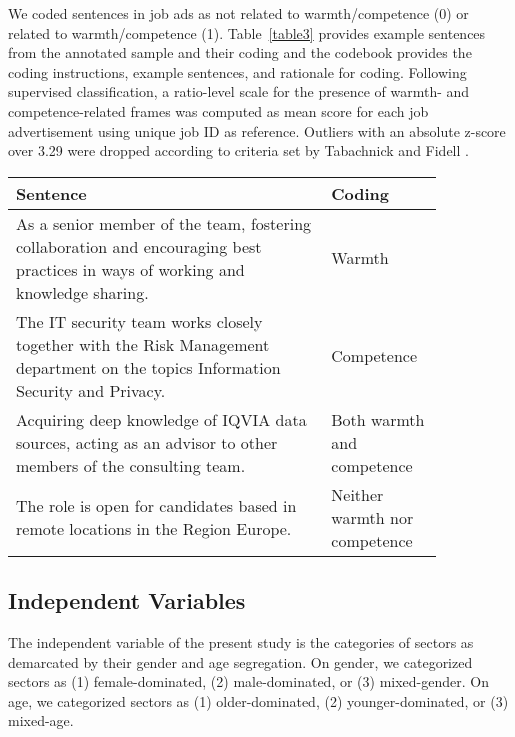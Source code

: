 \documentclass[jou]{apa7}
\begin{document}
We coded sentences in job ads as not related to warmth/competence (0) or related to warmth/competence (1). Table~\ref{table3} provides example sentences from the annotated sample and their coding and the codebook provides the coding instructions, example sentences, and rationale for coding. Following supervised classification, a ratio-level scale for the presence of warmth- and competence-related frames was computed as mean score for each job advertisement using unique job ID as reference. Outliers with an absolute z-score over 3.29 were dropped according to criteria set by Tabachnick and Fidell \parencite{tabachnickUsingMultivariateStatistics2007}.

\begin{table*}
    \centering
    \vspace*{2em}
    \begin{threeparttable}
        \caption{Example sentence and their coding based on emphasis on warmth and competence}
        \label{table3}
        \begin{tabular}[]{@{}m{0.65\linewidth} m{0.20\linewidth}@{}}
            \toprule
            Sentence & Coding\\
            \midrule
            As a senior member of the team, fostering collaboration and encouraging best practices in ways of working and knowledge sharing. & Warmth\\
            \midrule
            The IT security team works closely together with the Risk Management department on the topics Information Security and Privacy. & Competence\\
            \midrule
            Acquiring deep knowledge of IQVIA data sources, acting as an advisor to other members of the consulting team. & Both warmth and competence\\
            \midrule
            The role is open for candidates based in remote locations in the Region Europe. & Neither warmth nor competence\\
            \bottomrule
            \end{tabular}
        \end{threeparttable}
    \end{table*}

\subsection{Independent Variables}
\label{independent_variables}
The independent variable of the present study is the categories of sectors as demarcated by their gender and age segregation. On gender, we categorized sectors as (1) female-dominated, (2) male-dominated, or (3) mixed-gender. On age, we categorized sectors as (1) older-dominated, (2) younger-dominated, or (3) mixed-age.
\end{document}
